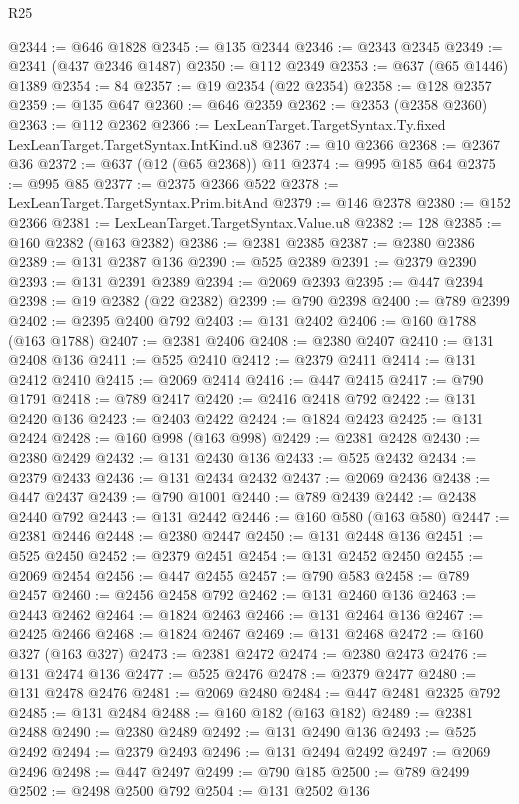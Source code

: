 \begin{lexlean}{R25}
\begin{coremodule}
{{{{{{{{{{{{{{{{{{{{{{{{{{{{{{{{{{{{{{{{{{{{{{{{{{{{{{{{{{{{{{{{{{{{{{{{{{{{{{{{{{{{{{{{{{{{{{{{{{{{{{{{{{{{{{{{{{{{{{{{{{{{{{{{{{{{{{{{{{{{{{{{{{{{{{{{{{{{{{{{{{{{{{{{{{{{{{{{{{{{{{{{{{{{{{{{{{{{{{{@2344 := @646 @1828
@2345 := @135 @2344
@2346 := @2343 @2345
@2349 := @2341 (@437 @2346 @1487)
@2350 := @112 @2349
@2353 := @637 (@65 @1446) @1389
@2354 := 84
@2357 := @19 @2354 (@22 @2354)
@2358 := @128 @2357
@2359 := @135 @647
@2360 := @646 @2359
@2362 := @2353 (@2358 @2360)
@2363 := @112 @2362
@2366 := LexLeanTarget.TargetSyntax.Ty.fixed LexLeanTarget.TargetSyntax.IntKind.u8
@2367 := @10 @2366
@2368 := @2367 @36
@2372 := @637 (@12 (@65 @2368)) @11
@2374 := @995 @185 @64
@2375 := @995 @85
@2377 := @2375 @2366 @522
@2378 := LexLeanTarget.TargetSyntax.Prim.bitAnd
@2379 := @146 @2378
@2380 := @152 @2366
@2381 := LexLeanTarget.TargetSyntax.Value.u8
@2382 := 128
@2385 := @160 @2382 (@163 @2382)
@2386 := @2381 @2385
@2387 := @2380 @2386
@2389 := @131 @2387 @136
@2390 := @525 @2389
@2391 := @2379 @2390
@2393 := @131 @2391 @2389
@2394 := @2069 @2393
@2395 := @447 @2394
@2398 := @19 @2382 (@22 @2382)
@2399 := @790 @2398
@2400 := @789 @2399
@2402 := @2395 @2400 @792
@2403 := @131 @2402
@2406 := @160 @1788 (@163 @1788)
@2407 := @2381 @2406
@2408 := @2380 @2407
@2410 := @131 @2408 @136
@2411 := @525 @2410
@2412 := @2379 @2411
@2414 := @131 @2412 @2410
@2415 := @2069 @2414
@2416 := @447 @2415
@2417 := @790 @1791
@2418 := @789 @2417
@2420 := @2416 @2418 @792
@2422 := @131 @2420 @136
@2423 := @2403 @2422
@2424 := @1824 @2423
@2425 := @131 @2424
@2428 := @160 @998 (@163 @998)
@2429 := @2381 @2428
@2430 := @2380 @2429
@2432 := @131 @2430 @136
@2433 := @525 @2432
@2434 := @2379 @2433
@2436 := @131 @2434 @2432
@2437 := @2069 @2436
@2438 := @447 @2437
@2439 := @790 @1001
@2440 := @789 @2439
@2442 := @2438 @2440 @792
@2443 := @131 @2442
@2446 := @160 @580 (@163 @580)
@2447 := @2381 @2446
@2448 := @2380 @2447
@2450 := @131 @2448 @136
@2451 := @525 @2450
@2452 := @2379 @2451
@2454 := @131 @2452 @2450
@2455 := @2069 @2454
@2456 := @447 @2455
@2457 := @790 @583
@2458 := @789 @2457
@2460 := @2456 @2458 @792
@2462 := @131 @2460 @136
@2463 := @2443 @2462
@2464 := @1824 @2463
@2466 := @131 @2464 @136
@2467 := @2425 @2466
@2468 := @1824 @2467
@2469 := @131 @2468
@2472 := @160 @327 (@163 @327)
@2473 := @2381 @2472
@2474 := @2380 @2473
@2476 := @131 @2474 @136
@2477 := @525 @2476
@2478 := @2379 @2477
@2480 := @131 @2478 @2476
@2481 := @2069 @2480
@2484 := @447 @2481 @2325 @792
@2485 := @131 @2484
@2488 := @160 @182 (@163 @182)
@2489 := @2381 @2488
@2490 := @2380 @2489
@2492 := @131 @2490 @136
@2493 := @525 @2492
@2494 := @2379 @2493
@2496 := @131 @2494 @2492
@2497 := @2069 @2496
@2498 := @447 @2497
@2499 := @790 @185
@2500 := @789 @2499
@2502 := @2498 @2500 @792
@2504 := @131 @2502 @136
}}}}}}}}}}}}}}}}}}}}}}}}}}}}}}}}}}}}}}}}}}}}}}}}}}}}}}}}}}}}}}}}}}}}}}}}}}}}}}}}}}}}}}}}}}}}}}}}}}}}}}}}}}}}}}}}}}}}}}}}}}}}}}}}}}}}}}}}}}}}}}}}}}}}}}}}}}}}}}}}}}}}}}}}}}}}}}}}}}}}}}}}}}}}}}}}}}}}}}}
\end{coremodule}
\end{lexlean}
